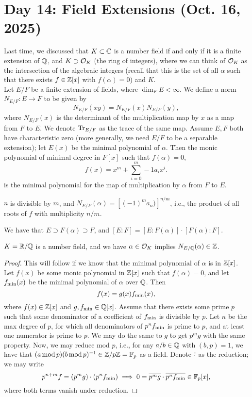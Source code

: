 \section{Day 14: Field Extensions (Oct. 16, 2025)}
Last time, we discussed that $K \subset \mathbb C$ is a number field if and only if it is a finite extension of $\mathbb Q$, and $K \supset \mathcal O_K$ (the ring of integers), where we can think of $\mathcal O_K$ as the intersection of the algebraic integers (recall that this is the set of all $\alpha$ such that there exists $f \in \mathbb Z[x]$ with $f(\alpha) = 0$) and $K$.
\\[8pt]
Let $E/F$ be a finite extension of fields, where $\dim_F E < \infty$. We define a norm $N_{E/F} : E \to F$ to be given by
\[ N_{E/F}(xy) = N_{E/F}(x) N_{E/F}(y), \]
where $N_{E/F}(x)$ is the determinant of the multiplication map by $x$ as a map from $F$ to $E$. We denote $\operatorname{Tr}_{E/F}$ as the trace of the same map. Assume $E, F$ both have characteristic zero (more generally, we need $E/F$ to be a separable extension); let $E(x)$ be the minimal polynomial of $\alpha$. Then the monic polynomial of minimal degree in $F[x]$ such that $f(\alpha) = 0$,
\[ f(x) = x^m + \sum_{i=0}^m-1 a_i x^i. \]
is the minimal polynomial for the map of multiplication by $\alpha$ from $F$ to $E$.
\begin{claim}
    $n$ is divisible by $m$, and $N_{E/F}(\alpha) = \left[(-1)^m a_n)\right]^{n/m}$, i.e., the product of all roots of $f$ with multiplicity $n/m$.
\end{claim}
\noindent We have that $E \supset F(\alpha) \supset F$, and $[E:F] = [E:F(\alpha)] \cdot [F(\alpha):F]$.
\begin{corollary}
    $K = \mathbb R/\mathbb Q$ is a number field, and we have $\alpha \in \mathcal O_K$ implies $N_{E/\mathbb Q}(\alpha) \in \mathbb Z$.
\end{corollary}
\begin{proof}
    This will follow if we know that the minimal polynomial of $\alpha$ is in $\mathbb Z[x]$. Let $f(x)$ be some monic polynomial in $\mathbb Z[x]$ such that $f(\alpha) = 0$, and let $f_{\operatorname{min}}(x)$ be the minimal polynomial of $\alpha$ over $\mathbb Q$. Then
    \[ f(x) = g(x) f_{\operatorname{min}}(x), \]
    where $f(x) \in \mathbb Z[x]$ and $g, f_{\operatorname{min}} \in \mathbb Q[x]$. Assume that there exists some prime $p$ such that some denominator of a coefficient of $f_{\operatorname{min}}$ is divisible by $p$. Let $n$ be the max degree of $p$, for which all denominators of $p^n f_{\operatorname{min}}$ is prime to $p$, and at least one numerator is prime to $p$. We may do the same to $g$ to get $p^m g$ with the same property. Now, we may reduce mod $p$, i.e., for any $a/b \in \mathbb Q$ with $(b, p) = 1$, we have that $(a \operatorname{mod} p) (b \operatorname{mod} p)^{-1} \in \mathbb Z/p\mathbb Z = \mathbb F_p$ as a field. Denote $\overline{\cdot}$ as the reduction; we may write
    \[ p^{n+m} f = (p^m g) \cdot (p^n f_{\operatorname{min}}) \implies 0 = \overline{p^m g} \cdot \overline{p^n f_{\operatorname{min}}} \in \mathbb F_p[x], \]
    where both terms vanish under reduction.
\end{proof}
